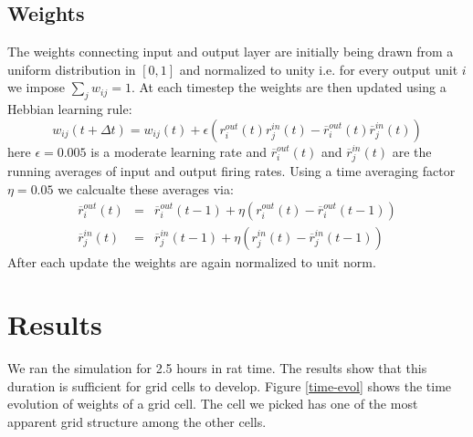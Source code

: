 \documentclass[a4paper, 12pt]{article}
\begin{document}
\subsection{Weights}
The weights connecting input and output layer are initially being drawn from a uniform distribution in $[0,1]$ and normalized to unity i.e. for every output unit $i$ we impose $\sum_jw_{ij}=1$. At each timestep the weights are then updated using a Hebbian learning rule:  
\begin{equation}
w_{ij}(t+\Delta t)= w_{ij}(t)+ \epsilon(r_i^{out}(t)r_j^{in}(t)-\overline{r}_i^{out}(t)\overline{r}_j^{in}(t))
\end{equation}
here  $\epsilon= 0.005$ is a moderate learning rate and $\overline{r}_i^{out}(t)$ and $\overline{r}_j^{in}(t)$ are the  running averages of input and output firing rates. Using a time averaging factor $\eta=0.05$ we calcualte these averages via: 
	\begin{eqnarray}
	\overline{r}_i^{out}(t) &=& \overline{r}_i^{out}(t-1)+ \eta(r_i^{out}(t)-\overline{r}_i^{out}(t-1))\\
	\overline{r}_j^{in}(t) &=& \overline{r}_j^{in}(t-1)+ \eta(r_j^{in}(t)-\overline{r}_j^{in}(t-1))
	\end{eqnarray}
After each update the weights are again normalized to unit norm. 
%
%
\section{Results}
We ran the simulation for 2.5 hours in rat time. The results show that this duration is sufficient for grid cells to develop. Figure \ref{time-evol} shows the time evolution of weights of a grid cell. The cell we picked has one of the most apparent grid structure among the other cells.
\end{document}
